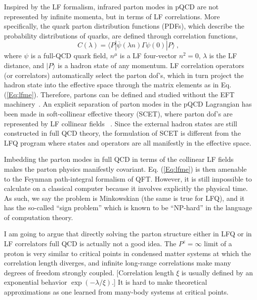 \documentclass[prd,aps,twocolumn,preprintnumbers,showpacs,nofootinbib,superscriptaddress,notitlepage]{revtex4-1}
\begin{document}
Inspired by the LF formalism, infrared parton modes in pQCD
are not represented by infinite momenta, but
in terms of LF correlations. More specifically,
the quark parton distribution functions (PDFs), which describe the probability
distributions of quarks, are defined through
correlation functions,
\begin{equation}
     C(\lambda)= \langle P|\overline \psi(\lambda n)\Gamma \psi(0)|P\rangle \ ,
\label{Eq:lfme}
\end{equation}
where $\psi$ is a full-QCD quark field, $n^\mu$ is a LF four-vector
$n^2=0$, $\lambda$ is the LF distance, and $|P\rangle$ is a hadron state
of any momentum. LF correlation operators (or correlators) automatically select
the parton dof's,  which in turn project the hadron state
into the effective space through the matrix elements as in Eq. (\ref{Eq:lfme}).
Therefore, partons can be defined and studied without the EFT machinery~\cite{Collins:2011zzd}.
An explicit separation of parton modes in the pQCD
Lagrangian has been made in soft-collinear effective theory
(SCET), where parton dof's are represented by LF collinear fields
~\cite{Bauer:2000yr,Bauer:2001ct,Bauer:2001yt}. Since the external hadron
states are still constructed in full QCD theory, the formulation
of SCET is different from the LFQ program where
states and operators are all manifestly in the effective space.

Imbedding the parton modes in full QCD
in terms of the collinear LF fields makes the parton physics
manifestly covariant.  Eq. (\ref{Eq:lfme}) is then amenable to
the Feynman path-integral formalism of QFT. However, it
is still impossible to calculate on a classical computer
because it involves explicitly the physical time. As such,
we say the problem is Minkowskian (the same is true
for LFQ), and it has the so-called  ``sign problem'' which is
known to be ``NP-hard'' in the language of computation theory.

I am going to argue that directly solving the
parton structure either in LFQ or in LF correlators
full QCD is actually not a good idea. The $P^z=\infty$ limit of a proton
is very similar to critical points in
condensed matter systems at which the correlation length
diverges, and infinite long-range correlations make many degrees
of freedom strongly coupled. [Correlation length $\xi$
is usually defined by an exponential behavior $\exp(-\lambda/\xi)$.]
It is hard to make theoretical
approximations as one learned from many-body systems at
critical points.
\end{document}
